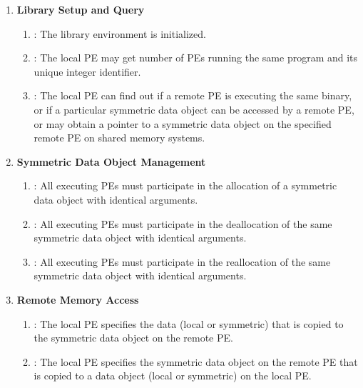 \begin{enumerate}
\item \textbf{Library Setup and Query}

\begin{enumerate}
\item {}: The \openshmem library environment is initialized. 
\item {}: The local \ac{PE} may get number of \acp{PE} running the same program and its unique integer identifier. 
\item {}: The local \ac{PE} can find out if a remote \ac{PE} is executing the same binary, or if a particular symmetric data object can be accessed by a remote \ac{PE}, or may obtain a pointer to a symmetric data object on the specified remote \ac{PE} on shared memory systems.
\end{enumerate}

\item \textbf{Symmetric Data Object Management}
\begin{enumerate}
\item {}: All executing \ac{PE}s must participate in the allocation of a symmetric data object with identical arguments.
\item  {}: All executing \ac{PE}s must participate in the deallocation of the same symmetric data object with identical arguments.
\item  {}: All executing \ac{PE}s must participate in the reallocation of the same symmetric data object with identical arguments.
\end{enumerate}

\item \textbf{Remote Memory Access}

\begin{enumerate}
\item \PUT: The local \ac{PE} specifies the \source{}
data (local or symmetric) that is copied to the symmetric data object on the remote \ac{PE}. 
\item \GET: The local \ac{PE} specifies the symmetric data object on the remote \ac{PE}
that is copied to a data object (local or symmetric) on the local \ac{PE}. 
\end{enumerate}


\end{enumerate}
